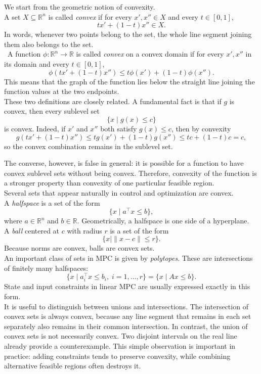 We start from the geometric notion of convexity.\\
A set $X \subseteq \mathbb{R}^n$ is called \emph{convex} if for every $x',x'' \in X$ and every $t \in [0,1]$,
$$
    tx' + (1-t)x'' \in X.
$$
In words, whenever two points belong to the set, the whole line segment joining them also belongs to the set.\\
\
A function $\phi : \mathbb{R}^n \to \mathbb{R}$ is called \emph{convex} on a convex domain if for every $x',x''$ in its domain and every $t \in [0,1]$,
$$
    \phi(tx' + (1-t)x'') \leq t \phi(x') + (1-t)\phi(x'').
$$
This means that the graph of the function lies below the straight line joining the function values at the two endpoints.\\

These two definitions are closely related. A fundamental fact is that if $g$ is convex, then every sublevel set
$$
    \{x \mid g(x) \leq c\}
$$
is convex. Indeed, if $x'$ and $x''$ both satisfy $g(x) \leq c$, then by convexity
$$
    g(tx' + (1-t)x'') \leq t g(x') + (1-t) g(x'') \leq tc + (1-t)c = c,
$$
so the convex combination remains in the sublevel set.

The converse, however, is false in general: it is possible for a function to have convex sublevel sets without being convex. Therefore, convexity of the function is a stronger property than convexity of one particular feasible region.\\

Several sets that appear naturally in control and optimization are convex.\\
A \emph{halfspace} is a set of the form
$$
    \{x \mid a^\top x \leq b\},
$$
where $a \in \mathbb{R}^n$ and $b \in \mathbb{R}$. Geometrically, a halfspace is one side of a hyperplane.\\
A \emph{ball} centered at $c$ with radius $r$ is a set of the form
$$
    \{x \mid \|x-c\| \leq r\}.
$$
Because norms are convex, balls are convex sets.\\
An important class of sets in MPC is given by \emph{polytopes}. These are intersections of finitely many halfspaces:
$$
    \{x \mid a_i^\top x \leq b_i,\; i=1,\dots,r\}
    =
    \{x \mid Ax \leq b\}.
$$
State and input constraints in linear MPC are usually expressed exactly in this form.\\
It is useful to distinguish between unions and intersections. The intersection of convex sets is always convex, because any line segment that remains in each set separately also remains in their common intersection. In contrast, the union of convex sets is not necessarily convex. Two disjoint intervals on the real line already provide a counterexample. This simple observation is important in practice: adding constraints tends to preserve convexity, while combining alternative feasible regions often destroys it.\\

